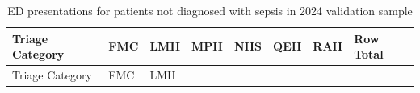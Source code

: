 \documentclass[
  a4paper,
  ,captions=tableheading
]{scrartcl}
\begin{document}
\begin{longtable}[]{@{}
  >{\raggedright\arraybackslash}p{}
  >{\raggedleft\arraybackslash}p{}
  >{\raggedleft\arraybackslash}p{}
  >{\raggedleft\arraybackslash}p{}
  >{\raggedleft\arraybackslash}p{}
  >{\raggedleft\arraybackslash}p{}
  >{\raggedleft\arraybackslash}p{}
  >{\raggedleft\arraybackslash}p{}@{}}
\caption{\label{tbl:hospitals_no_sepsis_2024}ED presentations for
patients not diagnosed with sepsis in 2024 validation
sample}\tabularnewline
\toprule\noalign{}
\begin{minipage}[b]{\linewidth}\raggedright
Triage Category
\end{minipage} & \begin{minipage}[b]{\linewidth}\raggedleft
FMC
\end{minipage} & \begin{minipage}[b]{\linewidth}\raggedleft
LMH
\end{minipage} & \begin{minipage}[b]{\linewidth}\raggedleft
MPH
\end{minipage} & \begin{minipage}[b]{\linewidth}\raggedleft
NHS
\end{minipage} & \begin{minipage}[b]{\linewidth}\raggedleft
QEH
\end{minipage} & \begin{minipage}[b]{\linewidth}\raggedleft
RAH
\end{minipage} & \begin{minipage}[b]{\linewidth}\raggedleft
Row Total
\end{minipage} \\
\midrule\noalign{}
\endfirsthead
\toprule\noalign{}
\begin{minipage}[b]{\linewidth}\raggedright
Triage Category
\end{minipage} & \begin{minipage}[b]{\linewidth}\raggedleft
FMC
\end{minipage} & \begin{minipage}[b]{\linewidth}\raggedleft
LMH
\end{minipage} & \begin{minipage}[b]{\linewidth}\raggedleft

\end{minipage}
\end{longtable}
\end{document}
